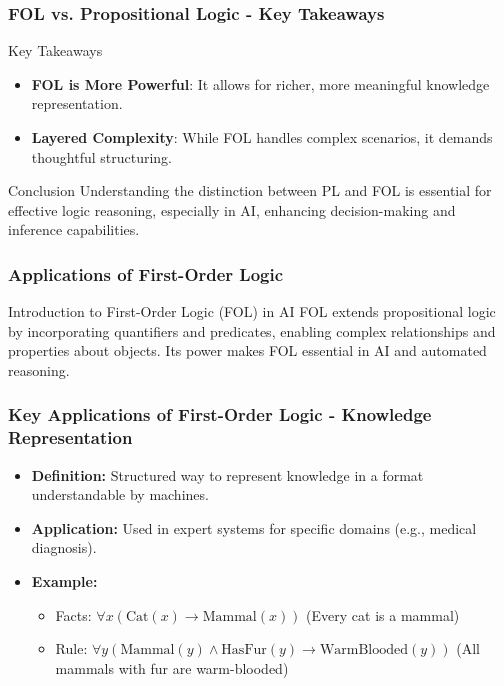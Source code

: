 \documentclass[aspectratio=169]{beamer}
\begin{document}
\begin{frame}[fragile]
  \frametitle{FOL vs. Propositional Logic - Key Takeaways}
  \begin{block}{Key Takeaways}
    \begin{itemize}
      \item \textbf{FOL is More Powerful}: It allows for richer, more meaningful knowledge representation.
      \item \textbf{Layered Complexity}: While FOL handles complex scenarios, it demands thoughtful structuring.
    \end{itemize}
  \end{block}
  
  \begin{block}{Conclusion}
    Understanding the distinction between PL and FOL is essential for effective logic reasoning, especially in AI, enhancing decision-making and inference capabilities.
  \end{block}
\end{frame}

\begin{frame}[fragile]
    \frametitle{Applications of First-Order Logic}
    \begin{block}{Introduction to First-Order Logic (FOL) in AI}
        FOL extends propositional logic by incorporating quantifiers and predicates, enabling complex relationships and properties about objects. Its power makes FOL essential in AI and automated reasoning.
    \end{block}
\end{frame}

\begin{frame}[fragile]
    \frametitle{Key Applications of First-Order Logic - Knowledge Representation}
    \begin{itemize}
        \item \textbf{Definition:} Structured way to represent knowledge in a format understandable by machines.
        \item \textbf{Application:} Used in expert systems for specific domains (e.g., medical diagnosis).
        \item \textbf{Example:}
            \begin{itemize}
                \item Facts: $\forall x (\text{Cat}(x) \rightarrow \text{Mammal}(x))$ (Every cat is a mammal)
                \item Rule: $\forall y (\text{Mammal}(y) \land \text{HasFur}(y) \rightarrow \text{WarmBlooded}(y))$ (All mammals with fur are warm-blooded)
            \end{itemize}
    \end{itemize}
\end{frame}
\end{document}
